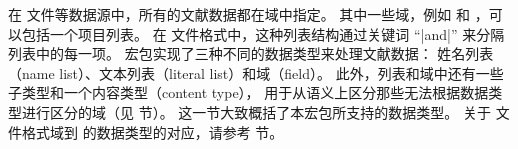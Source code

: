 
在  文件等数据源中，所有的文献数据都在域中指定。
其中一些域，例如  和 ，可以包括一个项目列表。
在 \BibTeX 文件格式中，这种列表结构通过关键词 “|and|” 来分隔列表中的每一项。
\biblatex 宏包实现了三种不同的数据类型来处理文献数据：
姓名列表（name list）、文本列表（literal list）和域（field）。
此外，列表和域中还有一些子类型和一个内容类型（content type），
用于从语义上区分那些无法根据数据类型进行区分的域（见  节）。
这一节大致概括了本宏包所支持的数据类型。
关于 \BibTeX 文件格式域到 \biblatex 的数据类型的对应，请参考  节。

